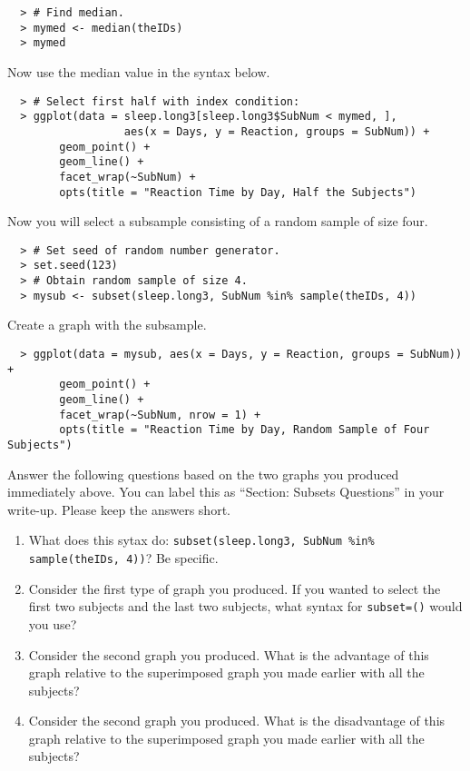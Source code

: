 \documentclass[]{article}
\begin{document}
\begin{verbatim}
  > # Find median.
  > mymed <- median(theIDs)
  > mymed
\end{verbatim}

\noindent Now use the median value in the syntax below.

\begin{verbatim}
  > # Select first half with index condition:
  > ggplot(data = sleep.long3[sleep.long3$SubNum < mymed, ], 
                  aes(x = Days, y = Reaction, groups = SubNum)) +
        geom_point() + 
        geom_line() + 
        facet_wrap(~SubNum) + 
        opts(title = "Reaction Time by Day, Half the Subjects")
\end{verbatim}

\noindent Now you will select a subsample consisting of a random sample of size four. 

\begin{verbatim}
  > # Set seed of random number generator.
  > set.seed(123)
  > # Obtain random sample of size 4.
  > mysub <- subset(sleep.long3, SubNum %in% sample(theIDs, 4))
\end{verbatim}

\noindent Create a graph with the subsample.

\begin{verbatim}
  > ggplot(data = mysub, aes(x = Days, y = Reaction, groups = SubNum)) +
        geom_point() + 
        geom_line() +
        facet_wrap(~SubNum, nrow = 1) +
        opts(title = "Reaction Time by Day, Random Sample of Four Subjects")
\end{verbatim}

\pagebreak
\noindent Answer the following questions based on the two graphs you produced immediately above. You can label this as ``Section: Subsets Questions'' in your write-up. Please keep the answers short.

\begin{enumerate}[resume]
\item What does this sytax do: \verb|subset(sleep.long3, SubNum %in% sample(theIDs, 4))|? Be specific.
\item Consider the first type of graph you produced. If you wanted to select the first two subjects and the last two subjects, what syntax for \texttt{subset=()} would you use?
\item Consider the second graph you produced. What is the advantage of this graph relative to the superimposed graph you made earlier with all the subjects?
\item Consider the second graph you produced. What is the disadvantage of this graph relative to the superimposed graph you made earlier with all the subjects?
\end{enumerate}
\end{document}
